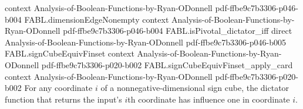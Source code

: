 \begin{theorem}
  {context}
  {Analysis-of-Boolean-Functions-by-Ryan-ODonnell}
  {pdf-ffbe9c7b3306-p046-b004}
\proofstep
  {FABL.dimensionEdgeNonempty}
  {context}
  {Analysis-of-Boolean-Functions-by-Ryan-ODonnell}
  {pdf-ffbe9c7b3306-p046-b004}
\proofstep
  {FABL.isPivotal_dictator_iff}
  {direct}
  {Analysis-of-Boolean-Functions-by-Ryan-ODonnell}
  {pdf-ffbe9c7b3306-p046-b005}
\proofstep
  {FABL.signCubeEquivFinset}
  {context}
  {Analysis-of-Boolean-Functions-by-Ryan-ODonnell}
  {pdf-ffbe9c7b3306-p020-b002}
\proofstep
  {FABL.signCubeEquivFinset_apply_card}
  {context}
  {Analysis-of-Boolean-Functions-by-Ryan-ODonnell}
  {pdf-ffbe9c7b3306-p020-b002}
For any coordinate $i$ of a nonnegative-dimensional sign cube, the dictator function
that returns the input's $i$th coordinate has influence one in coordinate $i$.
\end{theorem}

